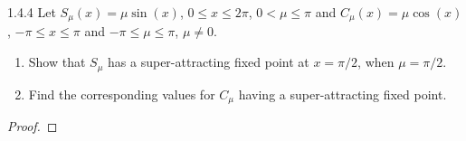 \begin{problem}{1.4.4}
  Let $S_\mu (x) = \mu \sin(x)$, $0 \leq x \leq 2\pi$, $0 < \mu \leq \pi$ and $C_\mu (x) = \mu \cos(x)$,
  $−\pi \leq x \leq \pi$ and $−\pi \leq \mu \leq \pi$, $\mu \neq 0$.
  \begin{enumerate}
    \item Show that $S_\mu$ has a super-attracting fixed point at $x = \pi/2$, when $\mu = \pi/2$.
    \item Find the corresponding values for $C_\mu$ having a super-attracting fixed point.
  \end{enumerate}
\end{problem}

\begin{proof}
\end{proof}
\newpage
